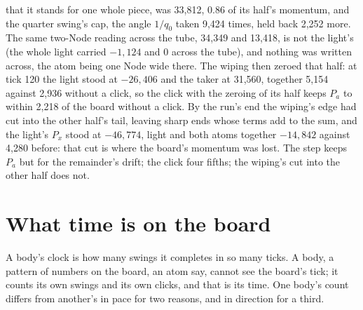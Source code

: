 \documentclass[pdflatex,sn-mathphys-num]{sn-jnl}
\begin{document}
that it stands for one whole piece, was 33,812, 0.86 of its half's momentum, and the quarter swing's cap, the angle $1/q_0$ taken 9,424 times, held back 2,252 more. The same two-Node reading across the tube, 34,349 and 13,418, is not the light's (the whole light carried $-1{,}124$ and 0 across the tube), and nothing was written across, the atom being one Node wide there. The wiping then zeroed that half: at tick 120 the light stood at $-26{,}406$ and the taker at 31,560, together 5,154 against 2,936 without a click, so the click with the zeroing of its half keeps $P_a$ to within 2,218 of the board without a click. By the run's end the wiping's edge had cut into the other half's tail, leaving sharp ends whose terms add to the sum, and the light's $P_x$ stood at $-46{,}774$, light and both atoms together $-14{,}842$ against 4,280 before: that cut is where the board's momentum was lost. The step keeps $P_a$ but for the remainder's drift; the click four fifths; the wiping's cut into the other half does not.

\section{What time is on the board}\label{sec:time}

A body's clock is how many swings it completes in so many ticks. A body, a pattern of numbers on the board, an atom say, cannot see the board's tick; it counts its own swings and its own clicks, and that is its time. One body's count differs from another's in pace for two reasons, and in direction for a third.
\end{document}
